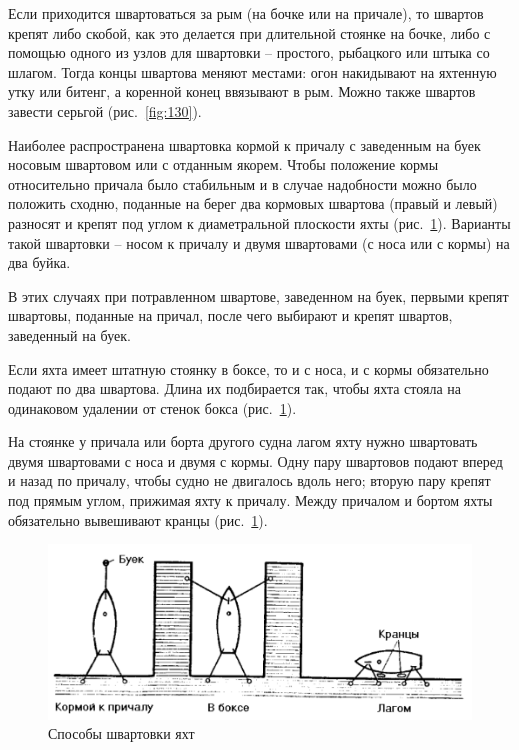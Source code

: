 \documentclass[a4paper, 12pt, twoside, final]{scrbook}
\begin{document}
Если приходится швартоваться за рым (на бочке или на причале), то швартов крепят либо скобой, как это делается при длительной стоянке на бочке, либо с помощью одного из узлов для швартовки \--- простого, рыбацкого или штыка со шлагом. Тогда концы швартова меняют местами: огон накидывают на яхтенную утку или битенг, а коренной конец ввязывают в рым. Можно также швартов завести серьгой (рис.~\ref{fig:130}).

Наиболее распространена швартовка кормой к причалу с заведенным на буек носовым швартовом или с отданным якорем. Чтобы положение кормы относительно причала было стабильным и в случае надобности можно было положить сходню, поданные на берег два кормовых швартова (правый и левый) разносят и крепят под углом к диаметральной плоскости яхты (рис.~\ref{fig:131}). Варианты такой швартовки \--- носом к причалу и двумя швартовами (с носа или с кормы) на два буйка.

В этих случаях при потравленном швартове, заведенном на буек, первыми крепят швартовы, поданные на причал, после чего выбирают и крепят швартов, заведенный на буек.

Если яхта имеет штатную стоянку в боксе, то и с носа, и с кормы обязательно подают по два швартова. Длина их подбирается так, чтобы яхта стояла на одинаковом удалении от стенок бокса (рис.~\ref{fig:131}).

На стоянке у причала или борта другого судна лагом яхту нужно швартовать двумя швартовами с носа и двумя с кормы. Одну пару швартовов подают вперед и назад по причалу, чтобы судно не двигалось вдоль него; вторую пару крепят под прямым углом, прижимая яхту к причалу. Между причалом и бортом яхты обязательно вывешивают кранцы (рис.~\ref{fig:131}).

\begin{figure}[htbp]
   \centering
   \includegraphics{pics/131_Sposoby_shvartovki} %
   \caption{Способы швартовки яхт}
   \label{fig:131}
\end{figure}
\end{document}
